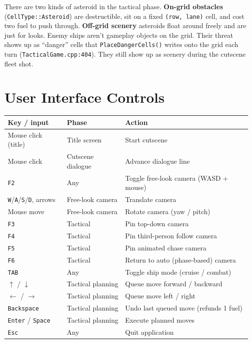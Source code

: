 \documentclass[11pt,a4paper]{article}
\begin{document}
There are two kinds of asteroid in the tactical phase.
\textbf{On-grid obstacles} (\texttt{CellType::Asteroid}) are destructible,
sit on a fixed \texttt{(row, lane)} cell, and cost two fuel to push
through. \textbf{Off-grid scenery} asteroids float around freely and are
just for looks. Enemy
ships aren't gameplay objects on the grid. Their threat shows up as
``danger'' cells that \texttt{PlaceDangerCells()} writes onto the grid
each turn (\texttt{TacticalGame.cpp:404}). They still show up as scenery
during the cutscene fleet shot.

\section{User Interface Controls}

\begin{center}
\begin{tabular}{lll}
\toprule
\textbf{Key / input} & \textbf{Phase} & \textbf{Action} \\
\midrule
Mouse click (title)             & Title screen        & Start cutscene \\
Mouse click                     & Cutscene dialogue   & Advance dialogue line \\
\texttt{F2}                     & Any                 & Toggle free-look camera (WASD + mouse) \\
\texttt{W}/\texttt{A}/\texttt{S}/\texttt{D}, arrows & Free-look camera & Translate camera \\
Mouse move                      & Free-look camera    & Rotate camera (yaw / pitch) \\
\texttt{F3}                     & Tactical            & Pin top-down camera \\
\texttt{F4}                     & Tactical            & Pin third-person follow camera \\
\texttt{F5}                     & Tactical            & Pin animated chase camera \\
\texttt{F6}                     & Tactical            & Return to auto (phase-based) camera \\
\texttt{TAB}                    & Any                 & Toggle ship mode (cruise / combat) \\
$\uparrow$ / $\downarrow$       & Tactical planning   & Queue move forward / backward \\
$\leftarrow$ / $\rightarrow$    & Tactical planning   & Queue move left / right \\
\texttt{Backspace}              & Tactical planning   & Undo last queued move (refunds 1 fuel) \\
\texttt{Enter} / \texttt{Space} & Tactical planning   & Execute planned moves \\
\texttt{Esc}                    & Any                 & Quit application \\
\bottomrule
\end{tabular}
\end{center}
\end{document}
